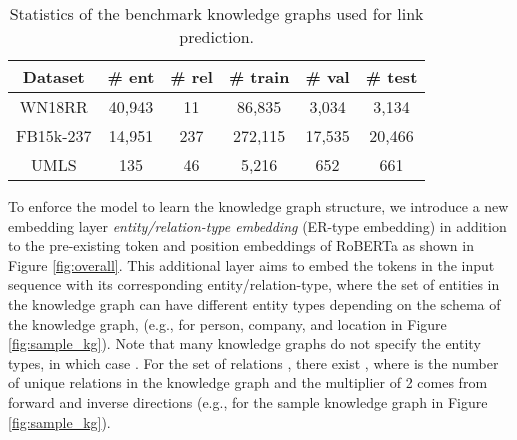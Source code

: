 \documentclass[11pt]{article}
\begin{document}
\setlength{\tabcolsep}{3.5pt}
\begin{table}[t]
 \caption{Statistics of the benchmark knowledge graphs used for link prediction.}
 \small
  \centering
  \begin{tabular}{cccccc}
    \toprule
    Dataset & \# ent & \# rel & \# train & \# val & \# test \\
    \midrule
    WN18RR & 40,943 & 11 & 86,835 & 3,034 & 3,134 \\
    FB15k-237 & 14,951 & 237 & 272,115 & 17,535 & 20,466 \\
    UMLS & 135 & 46 & 5,216 & 652 & 661 \\
    \bottomrule
  \end{tabular}
  \label{tab:datasets}
\end{table}

To enforce the model to learn the knowledge graph structure, we introduce a new embedding layer \emph{entity/relation-type embedding} (ER-type embedding) in addition to the pre-existing token and position embeddings of RoBERTa as shown in Figure \ref{fig:overall}. This additional layer aims to embed the tokens in the input sequence with its corresponding entity/relation-type, where the set of entities  in the knowledge graph can have  different entity types depending on the schema of the knowledge graph, (e.g.,  for person, company, and location in Figure \ref{fig:sample_kg}). Note that many knowledge graphs do not specify the entity types, in which case . For the set of relations , there exist , where  is the number of unique relations in the knowledge graph and the multiplier of 2 comes from forward and inverse directions (e.g.,  for the sample knowledge graph in Figure \ref{fig:sample_kg}).
\end{document}
